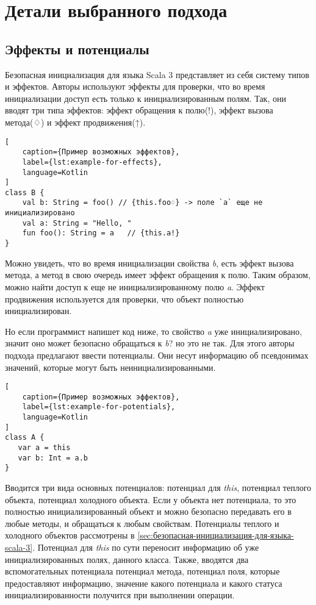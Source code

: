\section{Детали выбранного подхода}\label{sec:детали-выбранного-подхода}

\subsection{Эффекты и потенциалы}\label{subsec:эффекты-и-потенциалы}

Безопасная инициализация для языка Scala 3 представляет из себя систему типов и эффектов.
Авторы используют эффекты для проверки, что во время инициализации доступ есть только к инициализированным полям.
Так, они вводят три типа эффектов: эффект обращения к полю(!), эффект вызова метода(♢) и эффект продвижения(↑).
\begin{lstlisting}[
    caption={Пример возможных эффектов},
    label={lst:example-for-effects},
    language=Kotlin
]
class B {
    val b: String = foo() // {this.foo♢} -> поле `a` еще не инициализировано
    val a: String = "Hello, "
    fun foo(): String = a 	// {this.a!}
}
\end{lstlisting}
Можно увидеть, что во время инициализации свойства \emph{b},
есть эффект вызова метода, а метод в свою очередь имеет эффект обращения к полю.
Таким образом, можно найти доступ к еще не инициализированному полю \emph{a}.
Эффект продвижения используется для проверки, что объект полностью инициализирован.

Но если программист напишет код ниже, то свойство \emph{a} уже инициализировано, значит оно может безопасно обращаться к \emph{b}?
но это не так.
Для этого авторы подхода предлагают ввести потенциалы.
Они несут информацию об псевдонимах значений, которые могут быть неинициализированными.
\begin{lstlisting}[
    caption={Пример возможных эффектов},
    label={lst:example-for-potentials},
    language=Kotlin
]
class A {
   var a = this
   var b: Int = a.b
}
\end{lstlisting}
Вводится три вида основных потенциалов: потенциал для \emph{this}, потенциал теплого объекта, потенциал холодного объекта.
Если у объекта нет потенциала, то это полностью инициализированный объект и можно безопасно передавать его в любые методы,
и обращаться к любым свойствам.
Потенциалы теплого и холодного объектов рассмотрены в \autoref{sec:безопасная-инициализация-для-языка-scala-3}.
Потенциал для \emph{this} по сути переносит информацию об уже инициализированных полях, данного класса.
Также, вводятся два вспомогательных потенциала потенциал метода, потенциал поля, которые предоставляют информацию,
значение какого потенциала и какого статуса инициализированности получится при выполнении операции.

